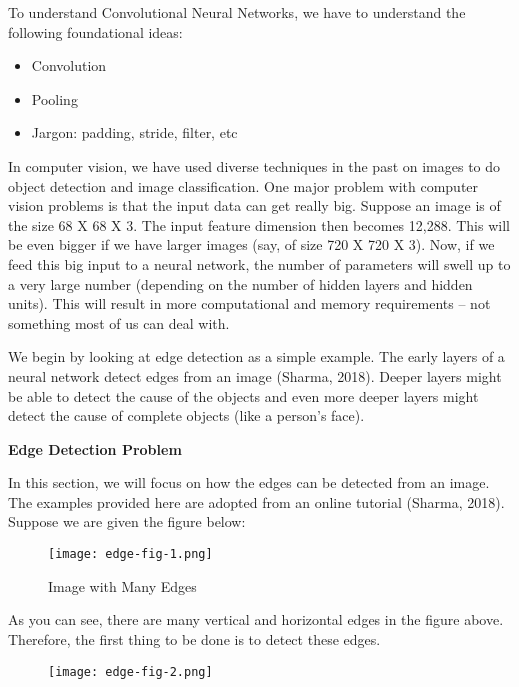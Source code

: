 \doublespacing
\setlength{\parindent}{1cm}

To understand Convolutional Neural Networks, we have to understand the following foundational ideas:

\begin{itemize}
  \item Convolution
  \item Pooling
  \item Jargon: padding, stride, filter, etc
\end{itemize}

In computer vision, we have used diverse techniques in the past on images to do object detection and image classification. One major problem with computer vision problems is that the input data can get really big. Suppose an image is of the size 68 X 68 X 3. The input feature dimension then becomes 12,288. This will be even bigger if we have larger images (say, of size 720 X 720 X 3). Now, if we feed this big input to a neural network, the number of parameters will swell up to a very large number (depending on the number of hidden layers and hidden units). This will result in more computational and memory requirements – not something most of us can deal with. \par

We begin by looking at edge detection as a simple example. The early layers of a neural network detect edges from an image (Sharma, 2018). Deeper layers might be able to detect the cause of the objects and even more deeper layers might detect the cause of complete objects (like a person’s face). \par

\textbf{Edge Detection Problem}

In this section, we will focus on how the edges can be detected from an image. The examples provided here are adopted from an online tutorial (Sharma, 2018). Suppose we are given the figure below:

\begin{figure}
  \caption{Image with Many Edges}
  \texttt{[image: edge-fig-1.png]}
\end{figure}

As you can see, there are many vertical and horizontal edges in the figure above. Therefore, the first thing to be done is to detect these edges.

\begin{figure}
  \texttt{[image: edge-fig-2.png]}
\end{figure}

